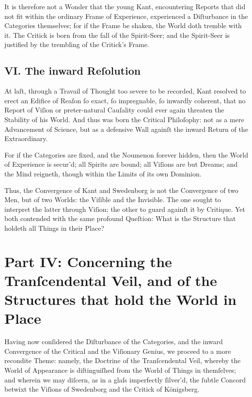 \documentclass[12pt]{article}
\begin{document}
It is therefore not a Wonder that the young Kant, encountering Reports that 
did not fit within the ordinary Frame of Experience, experienced a 
Diſturbance in the Categories themselves; for if the Frame be shaken, the 
World doth tremble with it. The Critick is born from the fall of the 
Spirit-Seer; and the Spirit-Seer is justified by the trembling of the 
Critick’s Frame.

\subsection*{VI. The inward Reſolution}

At laſt, through a Travail of Thought too severe to be recorded, Kant resolved 
to erect an Edifice of Reaſon ſo exact, ſo impregnable, ſo inwardly 
coherent, that no Report of Viſion or preter-natural Cauſality could ever again 
threaten the Stability of his World. And thus was born the Critical 
Philoſophy: not as a mere Advancement of Science, but as a defensive Wall 
againſt the inward Return of the Extraordinary.

For if the Categories are fixed, and the Noumenon forever hidden, then the 
World of Experience is secur’d; all Spirits are bound; all Viſions are but 
Dreams; and the Mind reigneth, though within the Limits of its own Dominion.

Thus, the Convergence of Kant and Swedenborg is not the Convergence of two 
Men, but of two Worlds: the Viſible and the Invisible. The one sought to 
interpret the latter through Viſion; the other to guard againſt it by Critique. 
Yet both contended with the same profound Queſtion: What is the Structure that 
holdeth all Things in their Place?

\newpage

\section*{Part IV: Concerning the Tranſcendental Veil, and of the Structures that hold the World in Place}

Having now conſidered the Diſturbance of the Categories, and the inward 
Convergence of the Critical and the Viſionary Genius, we proceed to a more 
recondite Theme: namely, the Doctrine of the Tranſcendental Veil, whereby the 
World of Appearance is diſtinguiſhed from the World of Things in themſelves; 
and wherein we may diſcern, as in a glaſs imperfectly ſilver’d, the ſubtle 
Concord betwixt the Viſions of Swedenborg and the Critick of Königsberg.
\end{document}

